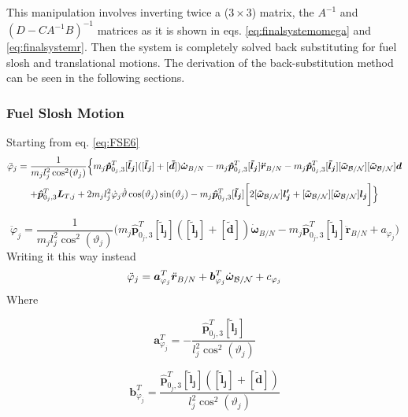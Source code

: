 This manipulation involves inverting twice a ($3\times 3$) matrix, the $A^{-1}$ and $(D-CA^{-1}B)^{-1}$ matrices as it is shown in eqs. \eqref{eq:finalsystemomega}  and \eqref{eq:finalsystemr}. Then the system is completely solved back substituting for fuel slosh and translational motions. The derivation of the back-substitution method can be seen in the following sections. 
\\

\subsubsection{Fuel Slosh Motion}
Starting from eq. \eqref{eq:FSE6}
\begin{multline}
	\ddot{\varphi}_j  =\frac{1}{m_j l_j^2 \cos^2(\vartheta_j)}\Big\{m_{j}\bm{\hat{p}}_{0_j,3}^T [\bm{\tilde{l}_j}]( [\bm{\tilde{l}_j}]+[\bm{\tilde{d}}]) \bm{\dot{\omega}}_{B/N} -m_{j} \bm{\hat{p}}_{0_j,3}^{T} [\bm{\tilde{l}_j}] \bm{\ddot{r}}_{B/N} -m_{j} \bm{\hat{p}}_{0_j,3}^{T} [\bm{\tilde{l}_j}][\bm{\tilde{\omega}}_{\cal B/N}][\bm{\tilde{\omega}}_{\cal B/N}] \bm{d}\\+\bm{\hat{p}}_{0_j,3}^T \bm{L}_{T,j}+2m_j l_j^2\dot{\varphi}_j\dot{\vartheta}\cos(\vartheta_j)\sin(\vartheta_j)- m_j \bm{\hat{p}}_{0_j,3}^T [\bm{\tilde{l}_j}]\bigg[2[\bm{\tilde{\omega}}_{\cal B/N}] \bm{l_j'}+[\bm{\tilde{\omega}}_{\cal B/N}][\bm{\tilde{\omega}}_{\cal B/N}] \bm{l_j}\bigg]\Big\}
	\label{eq:BSM1}
\end{multline}

\begin{equation}
	\ddot{\varphi}_j  =\frac{1}{m_j l_j^2 \cos^2(\vartheta_j)}\Big(m_{j}\bm{\hat{p}}_{0_j,3}^T [\bm{\tilde{l}_j}](  [\bm{\tilde{l}_j}]+ [\bm{\tilde{d}}]) \bm{\dot{\omega}}_{B/N} -m_{j} \bm{\hat{p}}_{0_j,3}^{T} [\bm{\tilde{l}_j}] \bm{\ddot{r}}_{B/N}+a_{\varphi_j} \Big)
	\label{eq:BSM2}
\end{equation}	
Writing it this way instead
\begin{equation}
	\ddot{\varphi}_j  = \bm a_{\varphi_j}^T \ddot{\bm{r}}_{B/N} + \bm b_{\varphi_j}^T \dot{\bm\omega}_{\cal B/N} +c_{\varphi_j}
	\label{eq:BSM3}
\end{equation}
Where 

\begin{equation}
	\bm a_{\varphi_j}^{T} = -\frac{\bm{\hat{p}}_{0_j,3}^{T} [\bm{\tilde{l}_j}]}{ l_j^2 \cos^2(\vartheta_j)}
	\label{eq:BSM4}
\end{equation}

\begin{equation}
	\bm b_{\varphi_j}^{T} = \frac{\bm{\hat{p}}_{0_j,3}^T [\bm{\tilde{l}_j}]( [\bm{\tilde{l}_j}]+ [\bm{\tilde{d}}])}{ l_j^2 \cos^2(\vartheta_j)}
	\label{eq:BSM5}
\end{equation}

